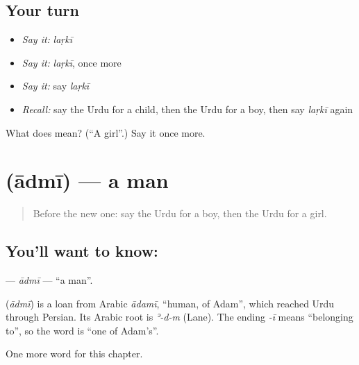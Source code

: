 \subsection*{Your turn}
\begin{itemize}
\raggedright
  \item \emph{Say it:} \emph{laṛkī}
  \item \emph{Say it:} \emph{laṛkī}, once more
  \item \emph{Say it:} say \emph{laṛkī}
  \item \emph{Recall:} say the Urdu for a child, then the Urdu for a boy, then say \emph{laṛkī} again
\end{itemize}

\begin{tcolorbox}[breakable,colback=teal!4,colframe=teal!35!black,title={Before you move on}]
What does  mean? (\textquotedblleft{}A girl\textquotedblright{}.) Say it once more.
\end{tcolorbox}
\section[\texorpdfstring{\ur{آدمی} (ādmī)}{آدمی (ādmī)}]{ (ādmī) — a man}

\label{lesson:UR-C45-admi}



\begin{quote}
Before the new one: say the Urdu for a boy, then the Urdu for a girl.
\end{quote}

\subsection*{You'll want to know: }
\textbf{} — \emph{ādmī} — \textquotedblleft{}a man\textquotedblright{}.

\begin{cousinweb}
\textbf{} (\emph{ādmī}) is a loan from Arabic \emph{ādamī}, \textquotedblleft{}human, of Adam\textquotedblright{}, which reached Urdu through Persian. Its Arabic root is \emph{ʾ-d-m} (Lane). The ending \emph{-ī} means \textquotedblleft{}belonging to\textquotedblright{}, so the word is \textquotedblleft{}one of Adam's\textquotedblright{}.
\end{cousinweb}

\begin{grammarlens}[title={What you've built}]
One more word for this chapter.
\end{grammarlens}

